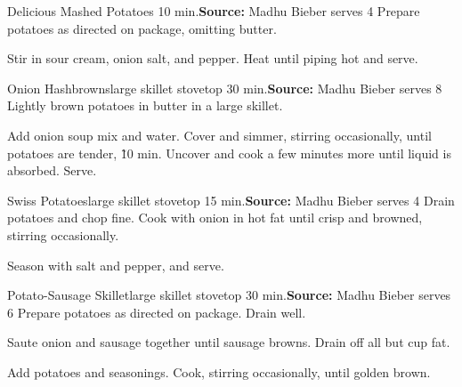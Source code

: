 \begin{recipe}{Delicious Mashed Potatoes}{ \hfill 10 min.}{\textbf{Source:} Madhu Bieber \hfill serves 4}
 Prepare potatoes as directed on package, omitting butter.

 Stir in sour cream, onion salt, and pepper. Heat until piping hot and serve.
\end{recipe}

\begin{recipe}{Onion Hashbrowns}{large skillet \hfill stovetop \hfill 30 min.}{\textbf{Source:} Madhu Bieber \hfill serves 8}
 Lightly brown potatoes in butter in a large skillet.

 Add onion soup mix and water. Cover and simmer, stirring occasionally, until potatoes are tender, \~10 min. Uncover and cook a few minutes more until liquid is absorbed. Serve.
\end{recipe}

\begin{recipe}{Swiss Potatoes}{large skillet \hfill stovetop \hfill 15 min.}{\textbf{Source:} Madhu Bieber \hfill serves 4}
 Drain potatoes and chop fine. Cook with onion in hot fat until crisp and browned, stirring occasionally.

 Season with salt and pepper, and serve.
\end{recipe}

\begin{recipe}{Potato-Sausage Skillet}{large skillet \hfill stovetop \hfill 30 min.}{\textbf{Source:} Madhu Bieber \hfill serves 6}
 Prepare potatoes as directed on package. Drain well.

 Saute onion and sausage together until sausage browns. Drain off all but  cup fat.

 Add potatoes and seasonings. Cook, stirring occasionally, until golden brown.
\end{recipe}

